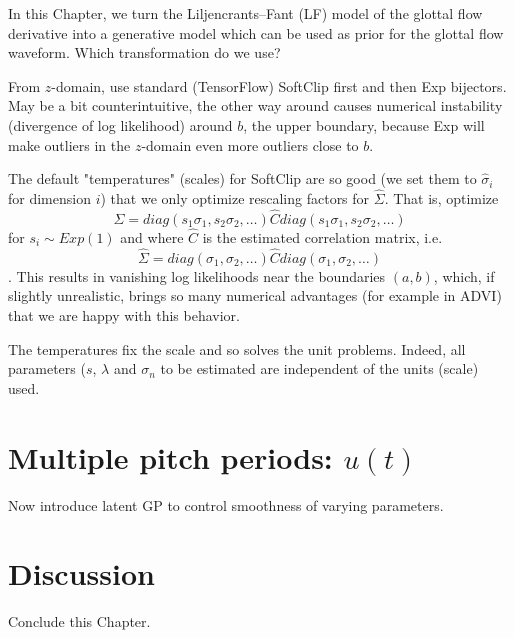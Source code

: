 \begin{chaptersections}{%
In this Chapter, we turn the Liljencrants–Fant (LF) model of the glottal flow derivative into a generative model which can be used as prior for the glottal flow waveform.
}
Which transformation do we use?

From $z$-domain, use standard (TensorFlow) SoftClip first and then Exp bijectors. May be a bit counterintuitive, the other way around causes numerical instability (divergence of log likelihood) around $b$, the upper boundary, because Exp will make outliers in the $z$-domain even more outliers close to $b$.

The default "temperatures" (scales) for SoftClip are so good (we set them to $\hat\sigma_i$ for dimension $i$) that we only optimize rescaling factors for $\hat\Sigma$. That is, optimize $$\Sigma = diag(s_1 \sigma_1, s_2 \sigma_2, \ldots) \hat{C} diag(s_1 \sigma_1, s_2 \sigma_2, \ldots)$$ for $s_i \sim Exp(1)$ and where $\hat{C}$ is the estimated correlation matrix, i.e. $$\hat{\Sigma} = diag(\sigma_1, \sigma_2, \ldots) \hat{C} diag(\sigma_1, \sigma_2, \ldots)$$. This results in vanishing log likelihoods near the boundaries $(a, b)$, which, if slightly unrealistic, brings so many numerical advantages (for example in ADVI) that we are happy with this behavior.

The temperatures fix the scale and so solves the unit problems.
Indeed, all parameters ($s$, $\lambda$ and $\sigma_n$ to be estimated are independent of the units (scale) used.

\section{Multiple pitch periods: $u(t)$}

Now introduce latent GP to control smoothness of varying parameters.

\section{Discussion}

Conclude this Chapter.

\end{chaptersections}

